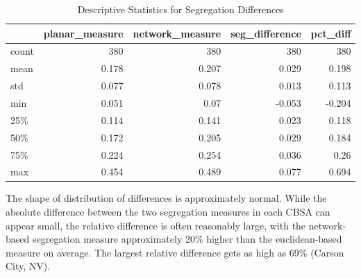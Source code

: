 \documentclass[
  10pt,
]{article}
\begin{document}
\begin{table}[h]

\begin{center}
\begin{tabular}{lrrrr}
\hline
       &   planar\_measure &   network\_measure &   seg\_difference &   pct\_diff \\
\hline
 count &          380     &           380     &          380     &    380     \\
 mean  &            0.178 &             0.207 &            0.029 &      0.198 \\
 std   &            0.077 &             0.078 &            0.013 &      0.113 \\
 min   &            0.051 &             0.07  &           -0.053 &     -0.204 \\
 25\%   &            0.114 &             0.141 &            0.023 &      0.118 \\
 50\%   &            0.172 &             0.205 &            0.029 &      0.184 \\
 75\%   &            0.224 &             0.254 &            0.036 &      0.26  \\
 max   &            0.454 &             0.489 &            0.077 &      0.694 \\
\hline
\end{tabular}


\caption{Descriptive Statistics for Segregation Differences}
\label{tbl:diff_descriptives}
\end{center}
\end{table}

The shape of distribution of differences is approximately normal. While
the absolute difference between the two segregation measures in each
CBSA can appear small, the relative difference is often reasonably
large, with the network-based segregation measure approximately 20\%
higher than the euclidean-based measure on average. The largest relative
difference gets as high as 69\% (Carson City, NV).
\end{document}
